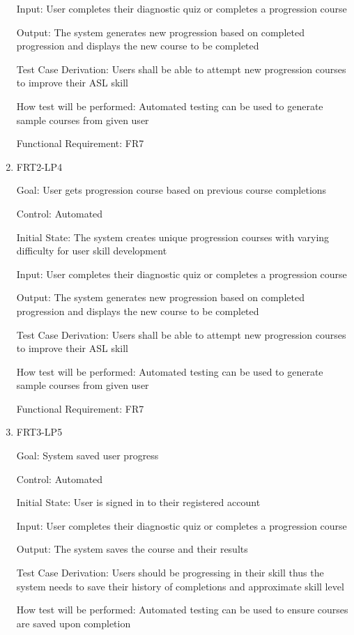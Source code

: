 \documentclass[12pt, titlepage]{article}
\begin{document}
\begin{enumerate}
Input: User completes their diagnostic quiz or completes a progression course
					
Output: The system generates new progression based on completed progression and displays the new course to be completed

Test Case Derivation: Users shall be able to attempt new progression courses to improve their ASL skill
					
How test will be performed: Automated testing can be used to generate sample courses from given user

Functional Requirement: FR7

\item{FRT2-LP4}

Goal: User gets progression course based on previous course completions

Control: Automated
					
Initial State: The system creates unique progression courses with varying difficulty for user skill development
					
Input: User completes their diagnostic quiz or completes a progression course
					
Output: The system generates new progression based on completed progression and displays the new course to be completed

Test Case Derivation: Users shall be able to attempt new progression courses to improve their ASL skill
					
How test will be performed: Automated testing can be used to generate sample courses from given user

Functional Requirement: FR7

\item{FRT3-LP5}

Goal: System saved user progress

Control: Automated
					
Initial State: User is signed in to their registered account

Input: User completes their diagnostic quiz or completes a progression course
					
Output: The system saves the course and their results

Test Case Derivation: Users should be progressing in their skill thus the system needs to save their history of completions and approximate skill level
					
How test will be performed: Automated testing can be used to ensure courses are saved upon completion


\end{enumerate}
\end{document}
